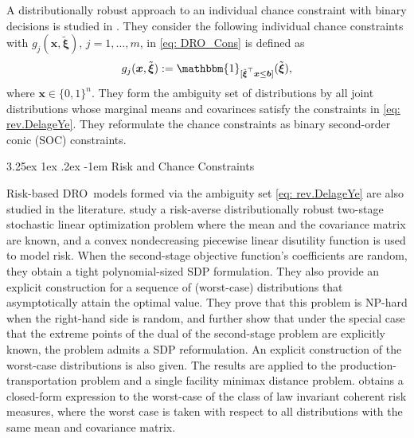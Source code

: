 \documentclass[final,onefignum,onetabnum]{class}
\makeatletter
\renewcommand\paragraph{\@startsection{paragraph}{4}{\z@}%
  {3.25ex \@plus1ex \@minus.2ex}%
  {-1em}%
  {\normalfont\normalsize\bfseries}}
\newcommand{\bs}[1]{\boldsymbol{#1}} %
\newcommand{\txi}{\tilde{\bs{\xi}}}
\newcommand{\dro}{DRO}
\makeatother
\begin{document}
A distributionally robust approach to an individual chance constraint with binary decisions is studied in \citet{zhang2018}.
They consider the following individual chance constraints with 
$g_{j}(\bs{x}, \txi)$, $j=1, \ldots, m$,  in \eqref{eq: DRO_Cons} is defined as 
$$g_{j}(\bs{x}, \txi):=\mathbbm{1}_{[\txi^{\top}\bs{x} \le \bs{b}]}(\txi),$$
where $\bs{x} \in \{0,1\}^{n}$. 
They form the ambiguity set of distributions by all joint distributions whose marginal means and covarinces satisfy the constraints in \eqref{eq: rev.DelageYe}. They  reformulate the chance constraints as binary  second-order conic (SOC) constraints. 

\paragraph{Risk and Chance Constraints}

Risk-based \dro\ models formed via the  ambiguity set \eqref{eq: rev.DelageYe} are also studied in the literature. 
\citet{bertsimas2010minmax} study a risk-averse distributionally robust two-stage stochastic linear optimization problem where  the mean and the covariance matrix are  known, and a convex nondecreasing piecewise linear disutility function is used to model risk. When the  second-stage objective function's coefficients   are random, they obtain a tight polynomial-sized SDP formulation. They also provide an explicit construction for a sequence of (worst-case) distributions that asymptotically attain the optimal value. They prove that this problem is NP-hard when the right-hand side is random, and  further show that under the special case that the extreme points of the dual  of the second-stage problem are explicitly known, the problem admits a SDP reformulation. An  explicit construction of the worst-case distributions is also given.  The results are applied to the production-transportation
problem and a single facility minimax distance problem. 
\citet{li2016law} obtains a closed-form expression to the worst-case of the class of law invariant coherent risk measures, where the worst case is taken with respect to all distributions with the same mean and covariance matrix. 
\end{document}
